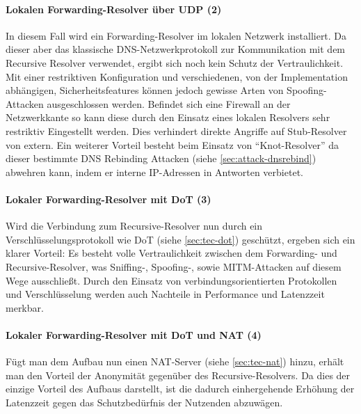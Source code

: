 \paragraph{Lokalen Forwarding-Resolver über UDP (2)}
In diesem Fall wird ein Forwarding-Resolver im lokalen Netzwerk installiert. Da dieser aber das klassische DNS-Netzwerkprotokoll zur Kommunikation mit dem Recursive Resolver verwendet, ergibt sich noch kein Schutz der Vertraulichkeit. Mit einer restriktiven Konfiguration und verschiedenen, von der Implementation abhängigen, Sicherheitsfeatures können jedoch gewisse Arten von Spoofing-Attacken ausgeschlossen werden. Befindet sich eine Firewall an der Netzwerkkante so kann diese durch den Einsatz eines lokalen Resolvers sehr restriktiv Eingestellt werden. Dies verhindert direkte Angriffe auf Stub-Resolver von extern. Ein weiterer Vorteil besteht beim Einsatz von ``Knot-Resolver'' da dieser bestimmte DNS Rebinding Attacken (siehe \ref{sec:attack-dnsrebind}) abwehren kann, indem er interne IP-Adressen in Antworten verbietet\cite{KnotResolverDocRebinding}.

\paragraph{Lokaler Forwarding-Resolver mit DoT (3)}
Wird die Verbindung zum Recursive-Resolver nun durch ein Verschlüsselungsprotokoll wie DoT (siehe \ref{sec:tec-dot}) geschützt, ergeben sich ein klarer Vorteil: Es besteht volle Vertraulichkeit zwischen dem Forwarding- und Recursive-Resolver, was Sniffing-, Spoofing-, sowie MITM-Attacken auf diesem Wege ausschließt. Durch den Einsatz von verbindungsorientierten Protokollen und Verschlüsselung werden auch Nachteile in Performance und Latenzzeit merkbar.

\paragraph{Lokaler Forwarding-Resolver mit DoT und NAT (4)}
Fügt man dem Aufbau nun einen NAT-Server (siehe \ref{sec:tec-nat}) hinzu, erhält man den Vorteil der Anonymität gegenüber des Recursive-Resolvers. Da dies der einzige Vorteil des Aufbaus darstellt, ist die dadurch einhergehende Erhöhung der Latenzzeit gegen das Schutzbedürfnis der Nutzenden abzuwägen.

